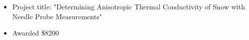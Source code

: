 \small
\begin{itemize}
    \item Project title: "Determining Anisotropic Thermal Conductivity of Snow with Needle Probe Measurements"
    \item Awarded \$8200
\end{itemize}
\normalsize
